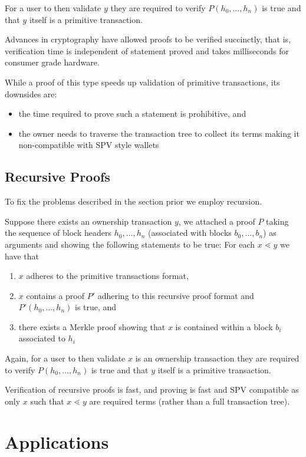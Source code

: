 \documentclass[9pt,oneside]{amsart}
\begin{document}
For a user to then validate $y$ they are required to verify $P(h_{0}, \dots, h_{n})$ is true and that $y$ itself is a primitive transaction.

Advances in cryptography have allowed proofs to be verified succinctly, that is, verification time is independent of statement proved and takes milliseconds for consumer grade hardware.

While a proof of this type speeds up validation of primitive transactions, its downsides are:
\begin{itemize}
    \item the time required to prove such a statement is prohibitive, and
    \item the owner needs to traverse the transaction tree to collect its terms making it non-compatible with SPV style wallets
\end{itemize}

\subsection{Recursive Proofs}
To fix the problems described in the section prior we employ recursion. 

Suppose there exists an ownership transaction $y$, we attached a proof $P$ taking the sequence of block headers $h_{0}, \dots, h_{n}$ (associated with blocks $b_{0}, \dots, b_{n}$) as arguments and showing the following statements to be true:
For each $x \lessdot y$ we have that
\begin{enumerate}
    \item $x$ adheres to the primitive transactions format,
    \item $x$ contains a proof $P'$ adhering to this recursive proof format and $P'(h_{0}, \dots, h_{n})$ is true, and
    \item there exists a Merkle proof showing that $x$ is contained within a block $b_{i}$ associated to $h_{i}$
\end{enumerate}

Again, for a user to then validate $x$ is an ownership transaction they are required to verify $P(h_{0}, \dots, h_{n})$ is true and that $y$ itself is a primitive transaction.

Verification of recursive proofs is fast, and proving is fast and SPV compatible as only $x$ such that $x \lessdot y$ are required terms (rather than a full transaction tree).

\section{Applications}
\end{document}
